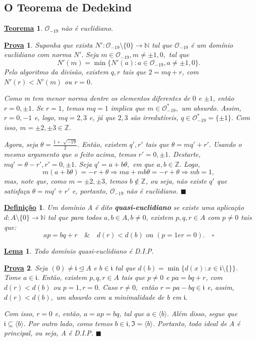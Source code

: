 \documentclass{article}
\newtheorem*{def*}{\underline{Defini\c c\~ao}}
\newtheorem*{theorem*}{\underline{Teorema}}
\newtheorem*{lemma*}{\underline{Lema}}
\newtheorem*{proof*}{\underline{Prova}}
\renewcommand\qedsymbol{$\blacksquare$}
\begin{document}
\subsection{O Teorema de Dedekind}
\begin{theorem*}
  \(\mathcal{O}_{-19}\) não é euclidiano.
\end{theorem*}
\begin{proof*}
  Suponha que exista \(N':\mathcal{O}_{-19}\setminus{\{0\}}\rightarrow \mathbb{N}\) tal que \(\mathcal{O}_{-19}\) é um domínio euclidiano com norma \(N'.\) Seja \(m\in \mathcal{O}_{-19}, m\neq \pm1, 0,\)
tal que 
  \[
    N'(m) = \min\{N'(a): a\in \mathcal{O}_{-19}, a\neq \pm1, 0\}.
  \]
  Pelo algoritmo da divisão, existem \(q, r\) tais que \(2 = mq + r\), com \(N'(r) < N'(m)\)
ou \(r=0\).

  Como m tem menor norma dentre os elementos diferentes de \(0\) e \(\pm 1\), então \(r=0, \pm1\). Se \(r=1\), temos
 \(mq = 1\) implica que \(m\in \mathcal{O}_{-19}^{*},\) um absurdo. Assim, \(r=0, -1\) e,
 logo, \(mq = 2, 3\) e, já que \(2, 3\) são irredutíveis, \(q\in \mathcal{O}_{-19}^{*} = \{\pm1\}.\) Com isso,
 \(m=\pm2, \pm 3\in \mathbb{Z}.\)
  
  Agora, seja \(\theta = \frac{1 + \sqrt[]{-19}}{2}.\) Então, existem \(q', r'\) tais que \(\theta  = mq'+r'.\) Usando o mesmo
argumento que o feito acima, temos \(r'=0, \pm1.\) Destarte, \(mq'=\theta - r', r'=0, \pm1.\) Seja \(q'= a + b\theta ,\)
em que \(a, b\in \mathbb{Z}.\) Logo, 
  \[
    m(a + b\theta ) = -r + \theta  \Rightarrow ma + mb\theta = -r + \theta  \Rightarrow mb = 1,
  \]
mas, note que, como \(m = \pm2, \pm3\), temos \(b\not\in \mathbb{Z}\), ou seja, não existe \(q'\) que satisfaça \(\theta  = mq' + r'\) e, portanto,
 \(\mathcal{O}_{-19}\) não é euclidiano. \qedsymbol
\end{proof*}
\begin{def*}
  Um domínio A é dito \textbf{quasi-euclidiano} se existe uma aplicação \(d:A\setminus{\{0\}}\rightarrow \mathbb{N}\) tal que para todos \(a, b\in A, b\neq0\),
existem \(p, q, r\in A\) com \(p\neq0\) tais que: 
  \[
    ap = bq + r\quad\&\quad d(r) < d(b) \text{ ou } (p=1 e r=0).\quad\square
  \]
\end{def*}
\begin{lemma*}
  Todo domínio quasi-euclidiano é D.I.P.
\end{lemma*}
\begin{proof*}
  Seja \((0)\neq \mathfrak{i}\trianglelefteq{A}\) e \(b\in \mathfrak{i}\) tal que \(d(b) = \min\{d(x):x\in \mathfrak{i}\setminus{\{\}}\}\).
Tome \(a\in \mathfrak{i}.\) Então, existem \(p, q, r\in A\) tais que \(p\neq 0\) e \(pa = bq + r\), com \(d(r) < d(b)\) ou \(p=1, r=0.\)
Caso \(r\neq 0,\) então \(r = pa-bq\in \mathfrak{i}\) e, assim, \(d(r) < d(b),\) um absurdo com a minimalidade de b em \(\mathfrak{i}.\)

  Com isso, \(r=0\) e, então, \(a = ap = bq\), tal que \(a\in \langle b \rangle.\) Além disso, segue que \(\mathfrak{i}\subseteq{\langle b \rangle}.\)
Por outro lado, como temos \(b\in \mathfrak{i}, \mathfrak{I} = \langle b \rangle\). Portanto, todo ideal de A é principal, ou seja, A é D.I.P. \qedsymbol
\end{proof*}
\end{document}
